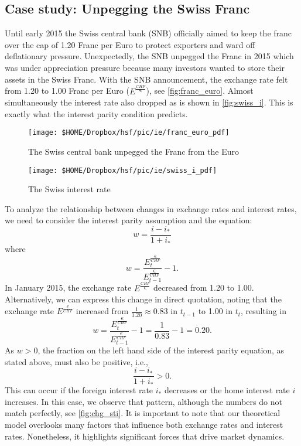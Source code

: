 \pbn
\subsection*{Case study: Unpegging the Swiss Franc}

Until early 2015 the Swiss central bank (SNB) officially aimed to keep the franc over the cap of 1.20 Franc per Euro to protect exporters and ward off deflationary pressure. Unexpectedly, the SNB unpegged the Franc in 2015 which was under appreciation pressure because many investors wanted to store their assets in the Swiss Franc. With the SNB announcement, the exchange rate felt from 1.20 to 1.00 Franc per Euro ($E^{\frac{CHF}{\euro}}$), see \autoref{fig:franc_euro}. Almost simultaneously the interest rate also dropped as is shown in \autoref{fig:swiss_i}. This is exactly what the interest parity condition predicts.
	
	
\begin{minipage}{0.5\linewidth}
	\begin{figure}[H]
		\centering
		\texttt{[image: \$HOME/Dropbox/hsf/pic/ie/franc\_euro\_pdf]}

		\caption{The Swiss central bank unpegged the Franc from the Euro}
	\label{fig:franc_euro}
	\end{figure}
\end{minipage}	
\begin{minipage}{0.5\linewidth}
	\begin{figure}[H]
		\centering
		\texttt{[image: \$HOME/Dropbox/hsf/pic/ie/swiss\_i\_pdf]}
		
		\caption{The Swiss interest rate}
		\label{fig:swiss_i}
	\end{figure}
\end{minipage}	

To analyze the relationship between changes in exchange rates and interest rates, we need to consider the interest parity assumption and the equation:
$$
w= \frac{i-i_{*}}{1+i_{*}}
$$
where
$$w=\frac{E_{t}^{\frac{\euro}{CHF}}}{E_{t-1}^{\frac{\euro}{CHF}}}-1.$$
In January 2015, the exchange rate $E^{\frac{CHF}{\euro}}$ decreased from 1.20 to 1.00. Alternatively, we can express this change in direct quotation, noting that the exchange rate $E^{\frac{\euro}{CHF}}$ increased from $\frac{1}{1.20}\approx 0.83$ in $t_{t-1}$ to 1.00 in $t_{t}$, resulting in
$$
w=\frac{E_{t}^{\frac{\euro}{CHF}}}{E_{t-1}^{\frac{\euro}{CHF}}}-1=\frac{1}{0.83}-1=0.20.
$$
As $w>0$, the fraction on the left hand side of the interest parity equation, as stated above, must also be positive, i.e., $$\frac{i-i_{*}}{1+i_{*}}>0.$$ This can occur if the foreign interest rate $i_*$ decreases or the home interest rate $i$ increases. In this case, we observe that pattern, although the numbers do not match perfectly, see \autoref{fig:chg_sti}. It is important to note that our theoretical model overlooks many factors that influence both exchange rates and interest rates. Nonetheless, it highlights significant forces that drive market dynamics.

